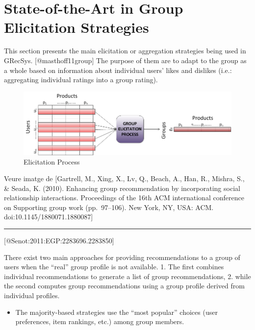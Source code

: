 \documentclass[]{article}
\author{}
\date{}
\makeatletter
\def\maxwidth{\ifdim\Gin@nat@width>\linewidth\linewidth
\else\Gin@nat@width\fi}
\let\Oldincludegraphics\includegraphics
\renewcommand{\includegraphics}[1]{\Oldincludegraphics[width=\maxwidth]{#1}}
\makeatother
\begin{document}
{
\hypersetup{linkcolor=black}
\tableofcontents
}
\section{State-of-the-Art in Group Elicitation Strategies}

This section presents the main elicitation or aggregation strategies
being used in GRecSys. {[}@masthoff11group{]} The purpose of them are to
adapt to the group as a whole based on information about individual
users' likes and dislikes (i.e.: aggregating individual ratings into a
group rating).

\begin{figure}[htbp]
\centering
\includegraphics{./img/ElicitationTechs.png}
\caption{Elicitation Process}
\end{figure}

Veure imatge de {[}Gartrell, M., Xing, X., Lv, Q., Beach, A., Han, R.,
Mishra, S., \& Seada, K. (2010). Enhancing group recommendation by
incorporating social relationship interactions. Proceedings of the 16th
ACM international conference on Supporting group work (pp.~97--106). New
York, NY, USA: ACM. doi:10.1145/1880071.1880087{]}

\begin{center}\rule{3in}{0.4pt}\end{center}

{[}@Senot:2011:EGP:2283696.2283850{]}

There exist two main approaches for providing recommendations to a group
of users when the ``real'' group profile is not available. 1. The first
combines individual recommendations to generate a list of group
recommendations, 2. while the second computes group recommendations
using a group profile derived from individual profiles.

\begin{itemize}
\item
  The majority-based strategies use the ``most popular'' choices (user
  preferences, item rankings, etc.) among group members.
\end{itemize}
\end{document}
